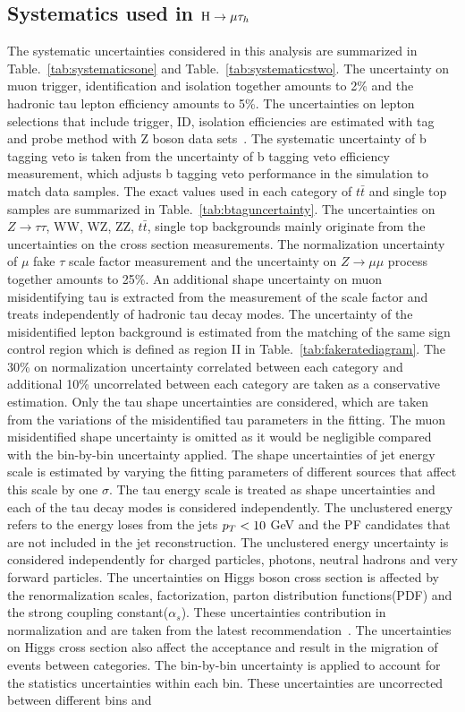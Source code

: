 \subsection{Systematics used in $\mathrm{H}\to \mu\tau_{h}$}
The systematic uncertainties considered in this analysis are summarized in Table.~\ref{tab:systematicsone} and Table.~\ref{tab:systematicstwo}. The uncertainty on muon trigger, identification and isolation together amounts  to 2\% and the hadronic tau lepton efficiency amounts to 5\%. The uncertainties on lepton selections that include trigger, ID, isolation efficiencies are estimated with tag and probe method with Z boson data sets~\cite{Khachatryan2011,Chatrchyan:2012xi,Khachatryan:2015hwa,Khachatryan:2015dfa,CMS:2016gvn}. The systematic uncertainty of b tagging veto is taken from the uncertainty of b tagging veto efficiency measurement, which adjusts b tagging veto performance in the simulation to match data samples. The exact values used in each category of $t\bar{t}$ and single top samples are summarized in Table.~\ref{tab:btaguncertainty}. The uncertainties on $Z\to\tau\tau$, WW, WZ, ZZ, $t\bar{t}$, single top backgrounds mainly originate from the uncertainties on the cross section measurements. The normalization uncertainty of $\mu$ fake $\tau$ scale factor measurement and the uncertainty on $Z\to \mu\mu$ process together amounts to 25\%. An additional shape uncertainty on muon misidentifying tau is extracted from the measurement of the scale factor and treats independently of hadronic tau decay modes. The uncertainty of the misidentified lepton background is estimated from the matching of the same sign control region which is defined as region II in Table.~\ref{tab:fakeratediagram}. The 30\% on normalization uncertainty correlated between each category and additional 10\% uncorrelated between each category are taken as a conservative estimation. Only the tau shape uncertainties are considered, which are taken from the variations of the misidentified tau parameters in the fitting. The muon misidentified shape uncertainty is omitted as it would be negligible compared with the bin-by-bin uncertainty applied.  The shape uncertainties of jet energy scale is estimated by varying the fitting parameters of different sources that affect this scale by one $\sigma$. The tau energy scale is treated as shape uncertainties and each of the tau decay modes is considered independently. The unclustered energy refers to the energy loses from the jets $p_{T}<10$ GeV and the PF candidates that are not included in the jet reconstruction. The unclustered energy uncertainty is considered independently for charged particles, photons, neutral hadrons and very forward particles.  The uncertainties on Higgs boson cross section is affected by the renormalization scales, factorization, parton distribution functions(PDF) and the strong coupling constant($\alpha_{s}$). These uncertainties contribution in normalization and are taken from the latest recommendation~\cite{YR4}. The uncertainties on Higgs cross section also affect the acceptance and result in the migration of events between categories.  The bin-by-bin uncertainty is applied to account for the statistics uncertainties within each bin. These uncertainties are uncorrected between different bins and 